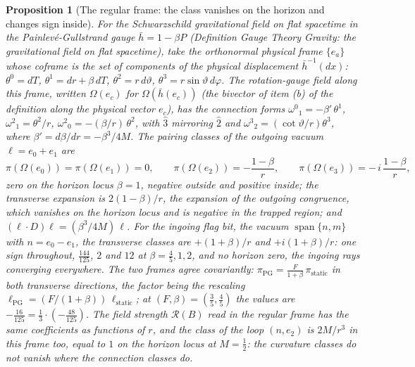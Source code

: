 \documentclass[11pt]{article}
\newtheorem{proposition}[theorem]{Proposition}
\theoremstyle{definition}
\theoremstyle{plain}
\providecommand{\hb}{}\renewcommand{\hb}{\bar{h}}
\providecommand{\pv}{}\renewcommand{\pv}{\pi}
\begin{document}
\begin{proposition}[The regular frame: the class vanishes on the horizon and changes sign inside]\label{c:pairing.regular-frame-class-vanishes-horizon-changes}
For the Schwarzschild gravitational field on flat spacetime in the Painlev\'e-Gullstrand gauge $\hb = 1 - \beta P$ (Definition \emph{Gauge Theory Gravity: the gravitational field on flat spacetime}), take the orthonormal physical frame $\{e_a\}$ whose coframe is the set of components of the physical displacement $\hb^{-1}(dx)$: $\theta^{0} = dT$, $\theta^{1} = dr + \beta\,dT$, $\theta^{2} = r\,d\vartheta$, $\theta^{3} = r\sin\vartheta\,d\varphi$. The rotation-gauge field along this frame, written $\Omega(e_c)$ for $\Omega(\hb(e_c))$ (the bivector of item (b) of the definition along the physical vector $e_c$), has the connection forms $\omega^{0}{}_{1} = -\beta'\,\theta^{1}$, $\omega^{2}{}_{1} = \theta^{2}/r$, $\omega^{2}{}_{0} = -(\beta/r)\,\theta^{2}$, with $\hat3$ mirroring $\hat2$ and $\omega^{3}{}_{2} = (\cot\vartheta/r)\theta^{3}$, where $\beta' = d\beta/dr = -\beta^{3}/4M$. The pairing classes of the outgoing vacuum $\ell = e_{0} + e_{1}$ are
\[
\pv(\Omega(e_{0})) = \pv(\Omega(e_{1})) = 0, \qquad \pv(\Omega(e_{2})) = -\frac{1 - \beta}{r}, \qquad \pv(\Omega(e_{3})) = -\,i\,\frac{1 - \beta}{r},
\]
zero on the horizon locus $\beta = 1$, negative outside and positive inside; the transverse expansion is $2(1 - \beta)/r$, the expansion of the outgoing congruence, which vanishes on the horizon locus and is negative in the trapped region; and $(\ell \cdot D)\ell = (\beta^{3}/4M)\,\ell$. For the ingoing flag bit, the vacuum $\operatorname{span}\{n, m\}$ with $n = e_{0} - e_{1}$, the transverse classes are $+(1 + \beta)/r$ and $+i(1 + \beta)/r$: one sign throughout, $\tfrac{144}{125}$, $2$ and $12$ at $\beta = \tfrac45, 1, 2$, and no horizon zero, the ingoing rays converging everywhere. The two frames agree covariantly: $\pv_{\mathrm{PG}} = \tfrac{F}{1 + \beta}\,\pv_{\mathrm{static}}$ in both transverse directions, the factor being the rescaling $\ell_{\mathrm{PG}} = (F/(1 + \beta))\,\ell_{\mathrm{static}}$; at $(F, \beta) = (\tfrac35, \tfrac45)$ the values are $-\tfrac{16}{125} = \tfrac13\cdot(-\tfrac{48}{125})$. The field strength $\mathcal{R}(B)$ read in the regular frame has the same coefficients as functions of $r$, and the class of the loop $(n, e_{2})$ is $2M/r^{3}$ in this frame too, equal to $1$ on the horizon locus at $M = \tfrac12$: the curvature classes do not vanish where the connection classes do.
\end{proposition}
\end{document}
